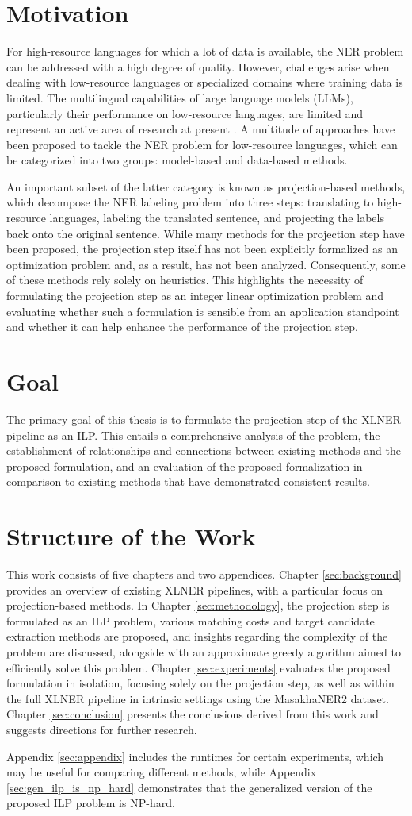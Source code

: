 \section{Motivation}
For high-resource languages for which a lot of data is available, the NER problem can be addressed
with a high degree of quality. However, challenges arise when dealing with low-resource languages or
specialized domains where training data is limited. The multilingual capabilities of large language
models (LLMs), particularly their performance on low-resource languages, are limited and represent
an active area of research at present \cite{lai-etal-2024-llms}. A multitude of approaches have
been proposed to tackle the NER problem for low-resource languages, which can be categorized
into two groups: model-based and data-based methods.

An important subset of the latter category is known as projection-based methods, which decompose
the NER labeling problem into three steps: translating to high-resource languages, labeling the
translated sentence, and projecting the labels back onto the original sentence. While many methods
for the projection step have been proposed, the projection step itself has not been explicitly formalized
as an optimization problem and, as a result, has not been analyzed. Consequently, some of these
methods rely solely on heuristics. This highlights the necessity of formulating the projection
step as an integer linear optimization problem and evaluating whether such a formulation is
sensible from an application standpoint and whether it can help enhance the performance of the
projection step.

\section{Goal}
The primary goal of this thesis is to formulate the projection step of the \ac{XLNER} pipeline as
an \ac{ILP}. This entails a comprehensive analysis of the problem, the establishment of relationships
and connections between existing methods and the proposed formulation, and an evaluation
of the proposed formalization in comparison to existing methods that have demonstrated
consistent results.

\section{Structure of the Work}
This work consists of five chapters and two appendices. Chapter \ref{sec:background} provides
an overview of existing XLNER pipelines, with a particular focus on projection-based methods.
In Chapter \ref{sec:methodology}, the projection step is formulated as an ILP problem, various
matching costs and target candidate extraction methods are proposed, and insights regarding the
complexity of the problem are discussed, alongside with an approximate greedy
algorithm aimed to efficiently solve this problem. Chapter \ref{sec:experiments} evaluates
the proposed formulation in isolation, focusing solely on the projection step, as well as
within the full XLNER pipeline in intrinsic settings using the MasakhaNER2 dataset.
Chapter \ref{sec:conclusion} presents the conclusions derived from this work and suggests
directions for further research.

Appendix \ref{sec:appendix} includes the runtimes for certain experiments, which may be useful for
comparing different methods, while Appendix \ref{sec:gen_ilp_is_np_hard} demonstrates that the
generalized version of the proposed ILP problem is NP-hard.
